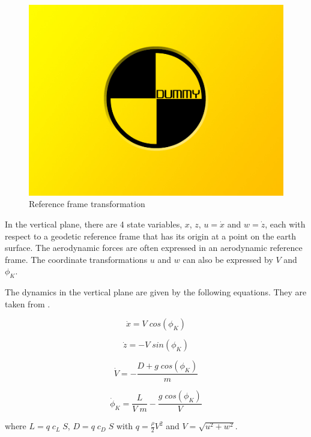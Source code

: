 \begin{figure}[h]
	\includegraphics[width=\textwidth]{src/pics/dummy.jpg}
	\caption{Reference frame transformation}
	\label{fig:coords2d} 
\end{figure}


In the vertical plane, there are 4 state variables, $x$, $z$, $u=\dot{x}$ and $w=\dot{z}$, each with respect to a geodetic reference frame that has its origin at a point on the earth surface. The aerodynamic forces are often expressed in an aerodynamic reference frame. The coordinate transformations $u$ and $w$ can also be expressed by $V$ and $\phi_K$.

The dynamics in the vertical plane are given by the following equations. They are taken from \cite{Fichter2009}. 

\begin{equation}
\dot{x} = V \; cos(\phi_K)
\end{equation}

\begin{equation}
\dot{z} = - V \; sin(\phi_K)
\end{equation}

\begin{equation}
\dot{V} = -\frac{D + g \; cos(\phi_K)}{m}
\end{equation}

\begin{equation}
\dot{\phi}_K = \frac{L}{V \; m} - \frac{g \; cos({\phi_K})}{V} 
\label{eq:dotgamma}
\end{equation}

where $L = q \; c_L \; S$, $D = q \; c_D \; S$ with $q = \frac{\rho}{2} V^2$ and $V=\sqrt{u^2+w^2}$.

